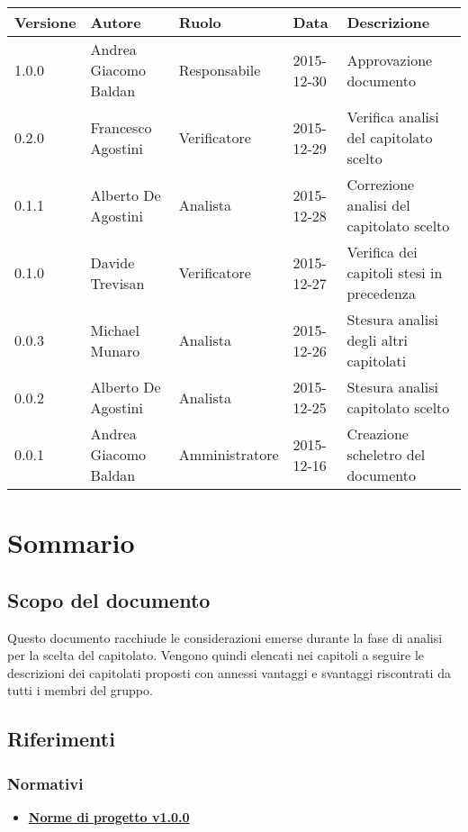 \documentclass{scalatekids-article}
\begin{document}
\begin{center}
  \begin{tabular}{| l | l | l | l | p{5cm} |}
    \hline
    Versione & Autore & Ruolo & Data & Descrizione \\
    \hline
    1.0.0 & Andrea Giacomo Baldan & Responsabile & 2015-12-30 & Approvazione documento\\
    \hline
    0.2.0 & Francesco Agostini & Verificatore & 2015-12-29 & Verifica analisi del capitolato scelto\\
    \hline
    0.1.1 & Alberto De Agostini & Analista & 2015-12-28 & Correzione analisi del capitolato scelto\\
    \hline
    0.1.0 & Davide Trevisan & Verificatore & 2015-12-27 & Verifica dei capitoli stesi in precedenza\\
    \hline
    0.0.3 & Michael Munaro & Analista & 2015-12-26 & Stesura analisi degli altri capitolati\\
    \hline
    0.0.2 & Alberto De Agostini & Analista & 2015-12-25 & Stesura analisi capitolato scelto\\
    \hline
    0.0.1 & Andrea Giacomo Baldan & Amministratore & 2015-12-16 & Creazione scheletro del documento\\
    \hline
  \end{tabular}
\end{center}
\tableofcontents
\newpage
{}
\section{Sommario}
\subsection{Scopo del documento}
Questo documento racchiude le considerazioni emerse durante la fase di analisi per la scelta del capitolato.
Vengono quindi elencati nei capitoli a seguire le descrizioni dei capitolati proposti con annessi vantaggi e svantaggi riscontrati da tutti i membri del gruppo.
\prodPurpose
\glossExpl
\subsection{Riferimenti}
\subsubsection{Normativi}
\begin{itemize}
\item \href{run:NormeDiProgetto_v0.0.1.tex}{\textbf{Norme di progetto v1.0.0}}
\end{itemize}
\end{document}
